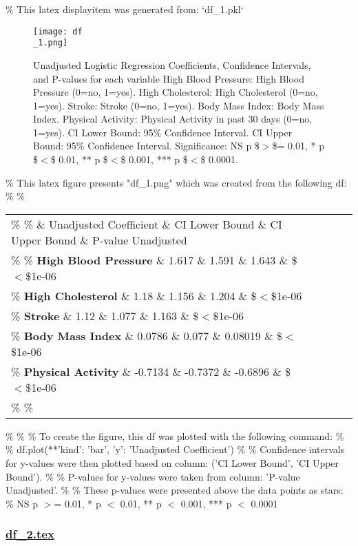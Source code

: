 \documentclass[11pt]{article}
\begin{document}
\begin{codeoutput}
\% This latex displayitem was generated from: `df\_1.pkl`

\begin{figure}[htbp]
\centering
\texttt{[image: df\\\_1.png]}
\caption{Unadjusted Logistic Regression Coefficients, Confidence Intervals, and P-values for each variable
High Blood Pressure: High Blood Pressure (0=no, 1=yes). 
High Cholesterol: High Cholesterol (0=no, 1=yes). 
Stroke: Stroke (0=no, 1=yes). 
Body Mass Index: Body Mass Index. 
Physical Activity: Physical Activity in past 30 days (0=no, 1=yes). 
CI Lower Bound: 95\% Confidence Interval. 
CI Upper Bound: 95\% Confidence Interval. 
Significance: NS p \$$>$\$= 0.01, * p \$$<$\$ 0.01, ** p \$$<$\$ 0.001, *** p \$$<$\$ 0.0001. }
\label{figure:Unadjusted\_Coefficients}
\end{figure}
\% This latex figure presents "df\_1.png" which was created from the following df:
\% 
\% \begin{tabular}{lrrrl}
\% \toprule
\%  \& Unadjusted Coefficient \& CI Lower Bound \& CI Upper Bound \& P-value Unadjusted \\
\% \midrule
\% \textbf{High Blood Pressure} \& 1.617 \& 1.591 \& 1.643 \& \$$<$\$1e-06 \\
\% \textbf{High Cholesterol} \& 1.18 \& 1.156 \& 1.204 \& \$$<$\$1e-06 \\
\% \textbf{Stroke} \& 1.12 \& 1.077 \& 1.163 \& \$$<$\$1e-06 \\
\% \textbf{Body Mass Index} \& 0.0786 \& 0.077 \& 0.08019 \& \$$<$\$1e-06 \\
\% \textbf{Physical Activity} \& -0.7134 \& -0.7372 \& -0.6896 \& \$$<$\$1e-06 \\
\% \bottomrule
\% \end{tabular}
\% 
\% 
\% To create the figure, this df was plotted with the following command:
\% 
\% df.plot(**{'kind': 'bar', 'y': 'Unadjusted Coefficient'})
\% 
\% Confidence intervals for y-values were then plotted based on column: ('CI Lower Bound', 'CI Upper Bound').
\% 
\% P-values for y-values were taken from column: 'P-value Unadjusted'.
\% 
\% These p-values were presented above the data points as stars:
\% NS p $>$= 0.01, * p $<$ 0.01, ** p $<$ 0.001, *** p $<$ 0.0001
\end{codeoutput}

\subsubsection*{\hyperlink{code-LaTeX Table Design-df-2-tex}{df\_2.tex}}
\end{document}

